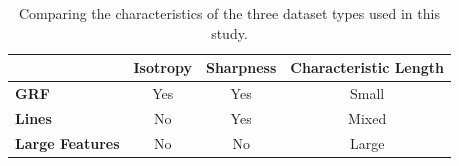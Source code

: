\documentclass[sn-mathphys]{sn-jnl}%
\theoremstyle{thmstyleone}%
\theoremstyle{thmstyletwo}%
\theoremstyle{thmstylethree}%
\begin{document}



\begin{table}[h]
\centering
\renewcommand{\arraystretch}{1.5} %
\begin{tabular}{|l|c|c|c|}
\hline
\textbf{ } & \textbf{Isotropy} & \textbf{Sharpness} & \textbf{Characteristic Length} \\ \hline
\textbf{GRF} & Yes & Yes & Small \\ \hline
\textbf{Lines} & No & Yes & Mixed \\ \hline
\textbf{Large Features} & No & No & Large \\ \hline
\end{tabular}
\caption{Comparing the characteristics of the three dataset types used in this study.}
\label{tab:comparison}
\end{table}




\end{document}
